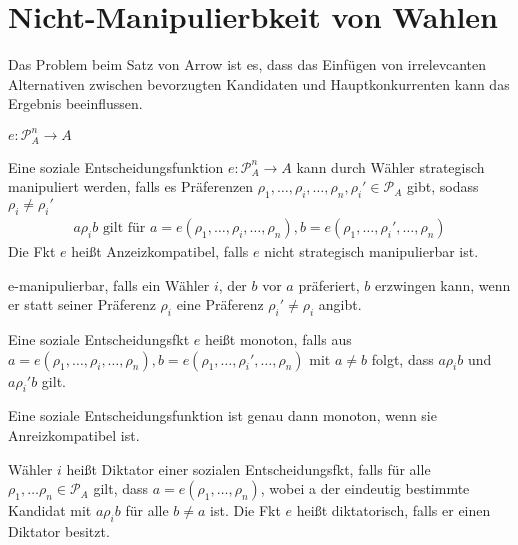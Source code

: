 \section{Nicht-Manipulierbkeit von Wahlen}
Das Problem beim Satz von Arrow ist es, dass das Einfügen von irrelevcanten Alternativen zwischen bevorzugten Kandidaten und Hauptkonkurrenten kann das Ergebnis beeinflussen. 

\begin{defi}
	$e: \mathcal{P}_A^n \rightarrow A$
\end{defi}

\begin{defi}
	Eine soziale Entscheidungsfunktion $e: \mathcal{P}_A^n \rightarrow A$ kann durch Wähler strategisch manipuliert werden, falls es Präferenzen $\rho_1, \dots, \rho_i, \dots, \rho_n, \rho_i' \in \mathcal{P}_A$ gibt, sodass $\rho_i \neq \rho_i'$ 
	\begin{align*}
		a \rho_i b \text{ gilt für }  a=e(\rho_1, \dots, \rho_i, \dots, \rho_n), b=e(\rho_1, \dots, \rho_i', \dots, \rho_n)
	\end{align*} 
	Die Fkt $e$ heißt Anzeizkompatibel, falls $e$ nicht strategisch manipulierbar ist. 
\end{defi}

\begin{rem}
	e-manipulierbar, falls ein Wähler $i$, der $b$ vor $a$ präferiert, $b$ erzwingen kann, wenn er statt seiner Präferenz $\rho_i$ eine Präferenz $\rho_i' \neq \rho_i$ angibt.  
\end{rem}

\begin{defi}[Monotonie]
	Eine soziale Entscheidungsfkt $e$ heißt monoton, falls aus 
	$ a=e(\rho_1, \dots, \rho_i, \dots, \rho_n), b=e(\rho_1, \dots, \rho_i', \dots, \rho_n)$ mit $a \neq b$ folgt, dass $a \rho_i b$ und $a \rho_i' b$ gilt. 
\end{defi}

\begin{thm}
	Eine soziale Entscheidungsfunktion ist genau dann monoton, wenn sie Anreizkompatibel ist. 
\end{thm}

\begin{defi}
	Wähler $i$ heißt Diktator einer sozialen Entscheidungsfkt, falls für alle $\rho_1, \dots \rho_n \in \mathcal{P}_A$ gilt, dass $ a=e(\rho_1, \dots, \rho_n)$, wobei a der eindeutig bestimmte Kandidat mit $a \rho_i b$ für alle $b \neq a$ ist. Die Fkt $e$ heißt diktatorisch, falls er einen Diktator besitzt. 
\end{defi}

